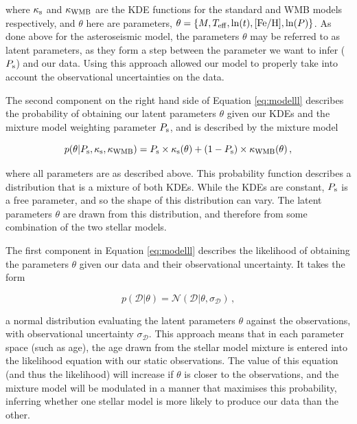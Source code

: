 \documentclass[12pt]{article}
\newcommand{\teff}{\mbox{$T_{\rm eff}$}\xspace}
\newcommand{\feh}{\mbox{$\rm{[Fe/H]}$}\xspace}
\begin{document}
\noindent where $\kappa_{\rm{s}}$ and $\kappa_{\rm{WMB}}$ are the KDE functions for the standard and WMB models respectively, and $\theta$ here are parameters, $\theta = \{M, \teff, \ln(t), \feh, \ln(P)\}$. As done above for the asteroseismic model, the parameters $\theta$ may be referred to as latent parameters, as they form a step between the parameter we want to infer ($P_{\rm{s}}$) and our data. Using this approach allowed our model to properly take into account the observational uncertainties on the data.

The second component on the right hand side of Equation \ref{eq:modelll} describes the probability of obtaining our latent parameters $\theta$ given our KDEs and the mixture model weighting parameter $P_{\rm s}$, and is described by the mixture model

\begin{equation}\label{eq:mixturell}
	p(\theta | P_{\rm{s}}, \kappa_{\rm{s}}, \kappa_{\rm{WMB}}) = P_{\rm s} \times \kappa_{\rm s}(\theta) + (1 - P_{\rm s}) \times \kappa_{\rm WMB}(\theta)\, ,
\end{equation}

\noindent where all parameters are as described above. This probability function describes a distribution that is a mixture of both KDEs. While the KDEs are constant, $P_{\rm s}$ is a free parameter, and so the shape of this distribution can vary. The latent parameters $\theta$ are drawn from this distribution, and therefore from some combination of the two stellar models.

The first component in Equation \ref{eq:modelll} describes the likelihood of obtaining the parameters $\theta$ given our data and their observational uncertainty. It takes the form

\begin{equation}
	p(\mathcal{D} | \theta) = \mathcal{N}(\mathcal{D} | \theta, \sigma_{\mathcal{D}})\, ,
\end{equation}

\noindent a normal distribution evaluating the latent parameters $\theta$ against the observations, with observational uncertainty $\sigma_{\mathcal{D}}$. This approach means that in each parameter space (such as age), the age drawn from the stellar model mixture is entered into the likelihood equation with our static observations. The value of this equation (and thus the likelihood) will increase if $\theta$ is closer to the observations, and the mixture model will be modulated in a manner that maximises this probability, inferring whether one stellar model is more likely to produce our data than the other.
\end{document}
